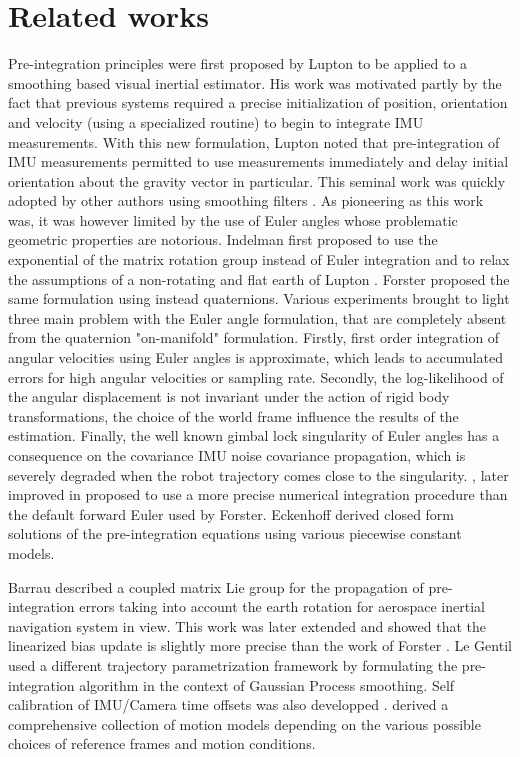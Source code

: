 \section{Related works}


Pre-integration principles were first proposed by Lupton \cite{lupton-09} to be applied to a smoothing based visual inertial estimator. His work was motivated partly 
by the fact that previous systems required a precise initialization of position, orientation and velocity (using a specialized routine) to begin to integrate IMU measurements. 
With this new formulation, Lupton noted that pre-integration of IMU measurements permitted to use measurements immediately and delay initial orientation about the gravity
vector in particular. 
This seminal work was quickly adopted by other authors using smoothing filters \cite{carlone2014eliminating}. As pioneering as this work was, it was however 
limited by the use of Euler angles whose problematic geometric properties are notorious. Indelman \cite{Indelman-2013-7768} first proposed to use the exponential of the 
matrix rotation group instead of Euler integration and to relax the assumptions of a non-rotating and flat earth of Lupton \cite{lupton-09}. Forster \cite{forster2015imu, forster2017-TRO}
proposed the same formulation using instead quaternions. Various experiments brought to light three main problem with the Euler angle formulation, that are completely absent 
from the quaternion "on-manifold" formulation. Firstly, first order integration of angular velocities using Euler angles is approximate, which leads to accumulated errors 
for high angular velocities or sampling rate.  Secondly, the log-likelihood of the angular displacement is not invariant under the action of rigid body transformations, 
\eg the choice of the world frame influence the results of the estimation. Finally, the well known gimbal lock singularity of Euler angles has a consequence 
on the covariance IMU noise covariance propagation, which is severely degraded when the robot trajectory comes close to the singularity. 
\cite{shen2015tightly}, later improved in \cite{qin2018vins} proposed to use a more precise numerical integration procedure than the default forward Euler used by Forster. 
Eckenhoff \cite{eckenhoff2019closed} derived closed form solutions of the pre-integration equations using various piecewise constant models.

Barrau \cite{barrau2020mathematical} described a coupled matrix Lie group for the propagation of pre-integration errors taking into account the earth rotation for aerospace
inertial navigation system in view. This work was later extended \cite{brossard2021associating} and showed that the linearized bias update is slightly more precise than 
the work of Forster \cite{forster2017-TRO}. Le Gentil \cite{le2020gaussian} used a different trajectory parametrization framework by formulating the pre-integration algorithm 
in the context of Gaussian Process smoothing. Self calibration of IMU/Camera time offsets was also developped \cite{yang2020analytic}. 
\cite{luo2021unified} derived a comprehensive collection of motion models depending on the various possible choices of reference frames and motion conditions. 

